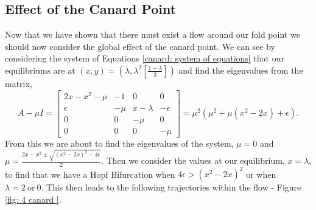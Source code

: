 \subsection{Effect of the Canard Point}\label{sec:effect-of-the-canard-point}
Now that we have shown that there must exist a flow around our fold point we should now consider the global effect of the canard point. We can see by considering the  system of Equations \ref{canard: system of equations} that our equilibriums are at $ (x,y)=(\lambda,\lambda^2[\frac{1-\lambda}{3}]) $ and find the eigenvalues from the matrix, 
\begin{equation}
A-\mu I=\begin{bmatrix}
2x-x^2-\mu&-1&0&0\\
\epsilon&-\mu&x-\lambda&-\epsilon\\
0&0&-\mu&0\\
0&0&0&-\mu
\end{bmatrix}=\mu^2(\mu^2+\mu(x^2-2x)+\epsilon).
\end{equation}
From this we are about to find the eigenvalues of the system, $ \mu=0 $ and $ \mu=\frac{2x-x^2\pm\sqrt{(x^2-2x)^2-4\epsilon}}{2} $. Then we consider the values at our equilibrium, $ x=\lambda $, to find that we have a Hopf Bifurcation when $ 4\epsilon>(x^2-2x)^2 $ or when $ \lambda=2 \ \text{or} \ 0 $. This then leads to the following trajectories within the flow - Figure \ref{fig: 4 canard }.

